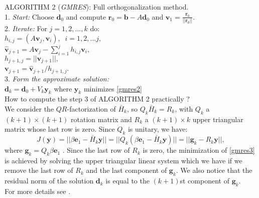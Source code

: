 ALGORITHM 2 (\textit{GMRES}): Full orthogonalization method.\\
1. \textit{Start:} Choose $\textbf{d}_0$ and compute $\textbf{r}_0 = \textbf{b}- A \textbf{d}_0$ and $\textbf{v}_1 = \frac{\textbf{r}_0}{||\textbf{r}_0||}$. \\
2. \textit{Iterate:} For $j=1,2,...,k$ do:\\
\hspace*{1cm} $h_{i,j} = (A\textbf{v}_j,\textbf{v}_i),\;\; i = 1,2,...j,$\\ 
\hspace*{1cm} $\hat{\textbf{v}}_{j+1} = A\textbf{v}_j - \sum_{i=1}^{j}h_{i,j}\textbf{v}_i,$ \\
\hspace*{1cm} $ h_{j+1,j} = ||\hat{\textbf{v}}_{j+1}||,$\\
\hspace*{1cm} $\textbf{v}_{j+1} = \hat{\textbf{v}}_{j+1}/h_{j+1,j}$.\\
3. \textit{Form the approximate solution:} \\
\hspace*{1cm} $\textbf{d}_k = \textbf{d}_0 + V_k \textbf{y}_k$  where  $\textbf{y}_k$ minimizes \eqref{gmres2} \\
How to compute the step 3 of ALGORITHM 2 practically ? \\
We consider the $QR$-factorization of $\bar{H}_k$, so $Q_k \bar{H}_k = R_k$, with $Q_k$ a $(k+1) \times (k+1)$ rotation matrix and $R_k$ a $(k+1) \times k$ upper triangular matrix whose last row is zero. Since $Q_k$ is unitary, we have:
\begin{equation}
\label{gmres3}
J(\textbf{y}) = ||\beta \textbf{e}_1 - \bar{H}_k \textbf{y}|| = ||Q_k (\beta \textbf{e}_1 - \bar{H}_k \textbf{y})|| = ||\textbf{g}_k - R_k \textbf{y}||,
\end{equation}
where $\textbf{g}_k= Q_k \beta \textbf{e}_1$ . Since the last row of $R_k$ is zero, the minimization of \eqref{gmres3} is achieved by solving the upper triangular linear system which we have if we remove the last row of $R_k$ and the last component of $\textbf{g}_k$. We also notice that the residual norm of the solution $\textbf{d}_k$ is equal to the $(k+1)$st component of $\textbf{g}_k$.\\
 For more details see \cite{GMRES}.\\
 
